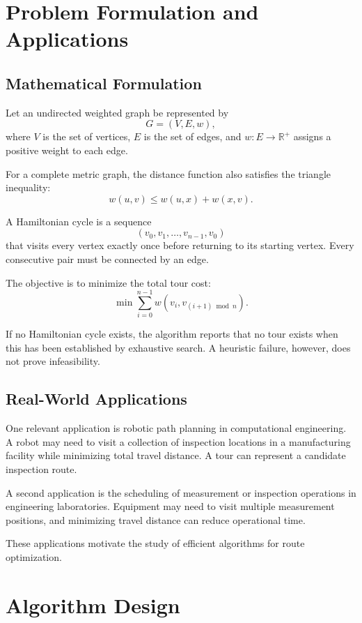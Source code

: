 \documentclass[english,times,final,mirror,longpaper]{revdetua}
\begin{document}
\section{Problem Formulation and Applications}

\subsection{Mathematical Formulation}

Let an undirected weighted graph be represented by
\[
G=(V,E,w),
\]
where $V$ is the set of vertices, $E$ is the set of edges, and
$w:E\rightarrow\mathbb{R}^{+}$ assigns a positive weight to each edge.

For a complete metric graph, the distance function also satisfies
the triangle inequality:
\[
w(u,v)\leq w(u,x)+w(x,v).
\]

A Hamiltonian cycle is a sequence
\[
(v_0,v_1,\ldots,v_{n-1},v_0)
\]
that visits every vertex exactly once before returning to its starting
vertex. Every consecutive pair must be connected by an edge.

The objective is to minimize the total tour cost:
\[
\min \sum_{i=0}^{n-1}w(v_i,v_{(i+1)\bmod n}).
\]

If no Hamiltonian cycle exists, the algorithm reports that no tour
exists when this has been established by exhaustive search.
A heuristic failure, however, does not prove infeasibility.

\subsection{Real-World Applications}

One relevant application is robotic path planning in computational
engineering. A robot may need to visit a collection of inspection
locations in a manufacturing facility while minimizing total travel
distance. A tour can represent a candidate inspection route.

A second application is the scheduling of measurement or inspection
operations in engineering laboratories. Equipment may need to visit
multiple measurement positions, and minimizing travel distance can
reduce operational time.

These applications motivate the study of efficient algorithms for
route optimization.

\section{Algorithm Design}
\end{document}
